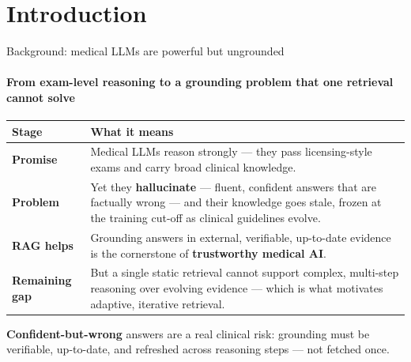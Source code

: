 \documentclass[10pt, aspectratio=169, t]{beamer}   %
\newcommand{\good}[1]{{\color{posblue}\bfseries #1}}  %
\newcommand{\warn}[1]{{\color{negmag}\bfseries #1}}   %
\begin{document}
\section{Introduction}

\begin{frame}{Background: medical LLMs are powerful but ungrounded}
  \framesubtitle{From exam-level reasoning to a grounding problem that one retrieval cannot solve}
  \vfill
  \begin{center}
  \renewcommand{\arraystretch}{1.22}
  \setlength{\tabcolsep}{8pt}
  \begin{tabular}{@{}>{\raggedright\arraybackslash}p{} >{\raggedright\arraybackslash}p{}@{}}
    \toprule
    \textbf{Stage} & \textbf{What it means}\\
    \midrule
    \textbf{Promise} & Medical LLMs reason strongly — they pass licensing-style exams and carry broad clinical knowledge.\\
    \textbf{Problem} & Yet they \warn{hallucinate} — fluent, confident answers that are factually wrong — and their knowledge goes stale, frozen at the training cut-off as clinical guidelines evolve.\\
    \textbf{RAG helps} & Grounding answers in external, verifiable, up-to-date evidence is the cornerstone of \good{trustworthy medical AI}.\\
    \rowcolor{accent!10}
    \textbf{Remaining gap} & But a single static retrieval cannot support complex, multi-step reasoning over evolving evidence — which is what motivates adaptive, iterative retrieval.\\
    \bottomrule
  \end{tabular}
  \end{center}
  \vfill
  \begin{tcolorbox}[title={Why it matters}]
    \warn{Confident-but-wrong} answers are a real clinical risk: grounding must be verifiable, up-to-date, and refreshed across reasoning steps — not fetched once.
  \end{tcolorbox}
  \vfill
\end{frame}

\end{document}
